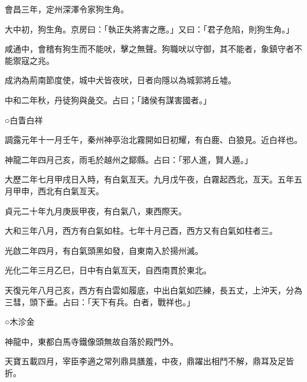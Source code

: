 \begin{pinyinscope}
 會昌三年，定州深澤令家狗生角。



 大中初，狗生角。京房曰：「執正失將害之應。」又曰：「君子危陷，則狗生角。」



 咸通中，會稽有狗生而不能吠，擊之無聲。狗職吠以守御，其不能者，象鎮守者不能禦寇之兆。



 成汭為荊南節度使，城中犬皆夜吠，日者向隱以為城郭將丘墟。



 中和二年秋，丹徒狗與彘交。占曰；「諸侯有謀害國者。」



 ○白眚白祥



 調露元年十一月壬午，秦州神亭治北霧開如日初耀，有白鹿、白狼見。近白祥也。



 神龍二年四月己亥，雨毛於越州之鄮縣。占曰：「邪人進，賢人遁。」



 大歷二年七月甲戌日入時，有白氣亙天。九月戊午夜，白霧起西北，亙天。五年五月甲申，西北有白氣亙天。



 貞元二十年九月庚辰甲夜，有白氣八，東西際天。



 大和三年八月，西方有白氣如柱。七年十月己酉，西方又有白氣如柱者三。



 光啟二年四月，有白氣頭黑如發，自東南入於揚州滅。



 光化二年三月乙巳，日中有白氣亙天，自西南貫於東北。



 天復元年八月己亥，西方有白雲如履底，中出白氣如匹練，長五丈，上沖天，分為三彗，頭下垂。占曰：「天下有兵。白者，戰祥也。」



 ○木沴金



 神龍中，東都白馬寺鐵像頭無故自落於殿門外。



 天寶五載四月，宰臣李適之常列鼎具膳羞，中夜，鼎躍出相鬥不解，鼎耳及足皆折。



\end{pinyinscope}